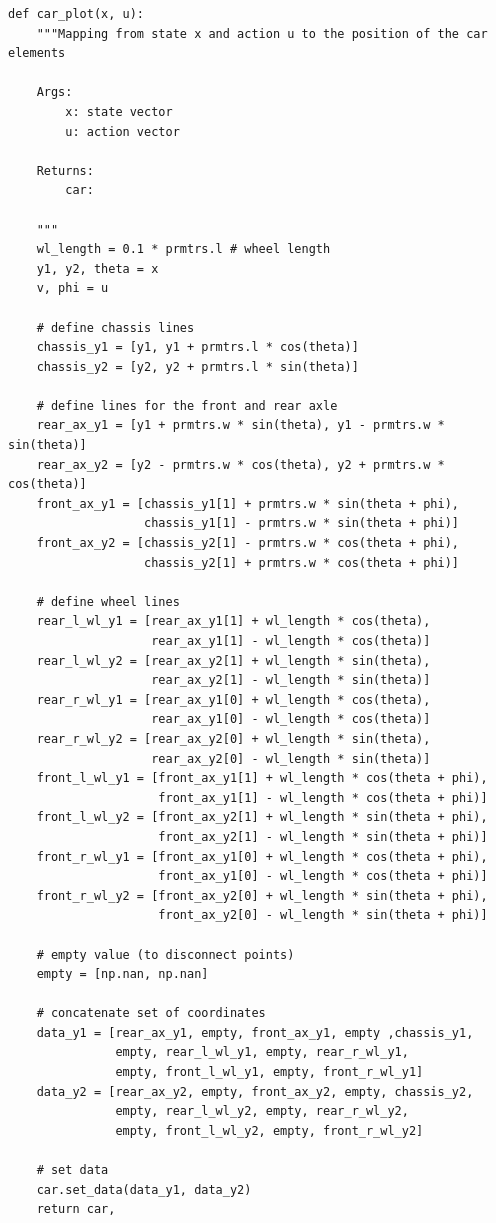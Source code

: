 \documentclass{article}
\begin{document}
\begin{lstlisting}
def car_plot(x, u):
    """Mapping from state x and action u to the position of the car elements

    Args:
        x: state vector
        u: action vector

    Returns:
        car:

    """
    wl_length = 0.1 * prmtrs.l # wheel length
    y1, y2, theta = x
    v, phi = u

    # define chassis lines
    chassis_y1 = [y1, y1 + prmtrs.l * cos(theta)]
    chassis_y2 = [y2, y2 + prmtrs.l * sin(theta)]

    # define lines for the front and rear axle
    rear_ax_y1 = [y1 + prmtrs.w * sin(theta), y1 - prmtrs.w * sin(theta)]
    rear_ax_y2 = [y2 - prmtrs.w * cos(theta), y2 + prmtrs.w * cos(theta)]
    front_ax_y1 = [chassis_y1[1] + prmtrs.w * sin(theta + phi),
                   chassis_y1[1] - prmtrs.w * sin(theta + phi)]
    front_ax_y2 = [chassis_y2[1] - prmtrs.w * cos(theta + phi),
                   chassis_y2[1] + prmtrs.w * cos(theta + phi)]

    # define wheel lines
    rear_l_wl_y1 = [rear_ax_y1[1] + wl_length * cos(theta),
                    rear_ax_y1[1] - wl_length * cos(theta)]
    rear_l_wl_y2 = [rear_ax_y2[1] + wl_length * sin(theta),
                    rear_ax_y2[1] - wl_length * sin(theta)]
    rear_r_wl_y1 = [rear_ax_y1[0] + wl_length * cos(theta),
                    rear_ax_y1[0] - wl_length * cos(theta)]
    rear_r_wl_y2 = [rear_ax_y2[0] + wl_length * sin(theta),
                    rear_ax_y2[0] - wl_length * sin(theta)]
    front_l_wl_y1 = [front_ax_y1[1] + wl_length * cos(theta + phi),
                     front_ax_y1[1] - wl_length * cos(theta + phi)]
    front_l_wl_y2 = [front_ax_y2[1] + wl_length * sin(theta + phi),
                     front_ax_y2[1] - wl_length * sin(theta + phi)]
    front_r_wl_y1 = [front_ax_y1[0] + wl_length * cos(theta + phi),
                     front_ax_y1[0] - wl_length * cos(theta + phi)]
    front_r_wl_y2 = [front_ax_y2[0] + wl_length * sin(theta + phi),
                     front_ax_y2[0] - wl_length * sin(theta + phi)]
                     
    # empty value (to disconnect points)
    empty = [np.nan, np.nan]
   
    # concatenate set of coordinates
    data_y1 = [rear_ax_y1, empty, front_ax_y1, empty ,chassis_y1,
               empty, rear_l_wl_y1, empty, rear_r_wl_y1,
               empty, front_l_wl_y1, empty, front_r_wl_y1]
    data_y2 = [rear_ax_y2, empty, front_ax_y2, empty, chassis_y2,
               empty, rear_l_wl_y2, empty, rear_r_wl_y2,
               empty, front_l_wl_y2, empty, front_r_wl_y2]

    # set data
    car.set_data(data_y1, data_y2)
    return car,
\end{lstlisting}
\end{document}

